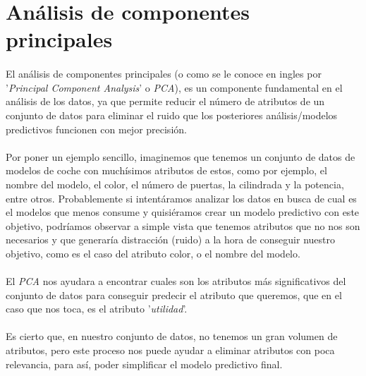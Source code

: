 \section{Análisis de componentes principales}
\label{section:pca}

\paragraph{}
El análisis de componentes principales (o como se le conoce en ingles por '\textit{Principal Component Analysis}' o \textit{PCA}), es un componente fundamental en el análisis de los datos, ya que permite reducir el número de atributos de un conjunto de datos para eliminar el ruido que los posteriores análisis/modelos predictivos funcionen con mejor precisión\cite{ref:pca_def}.

\paragraph{}
Por poner un ejemplo sencillo, imaginemos que tenemos un conjunto de datos de modelos de coche con muchísimos atributos de estos, como por ejemplo, el nombre del modelo, el color, el número de puertas, la cilindrada y la potencia, entre otros. Probablemente si intentáramos analizar los datos en busca de cual es el modelos que menos consume y quisiéramos crear un modelo predictivo con este objetivo, podríamos observar a simple vista que tenemos atributos que no nos son necesarios y que generaría distracción (ruido) a la hora de conseguir nuestro objetivo, como es el caso del atributo color, o el nombre del modelo.

\paragraph{}
El \textit{PCA} nos ayudara a encontrar cuales son los atributos más significativos del conjunto de datos para conseguir predecir el atributo que queremos\cite{ref:pca_def}, que en el caso que nos toca, es el atributo '\textit{utilidad}'.

\paragraph{}
Es cierto que, en nuestro conjunto de datos, no tenemos un gran volumen de atributos, pero este proceso nos puede ayudar a eliminar atributos con poca relevancia, para así, poder simplificar el modelo predictivo final.

\label{section:pca_standar}
